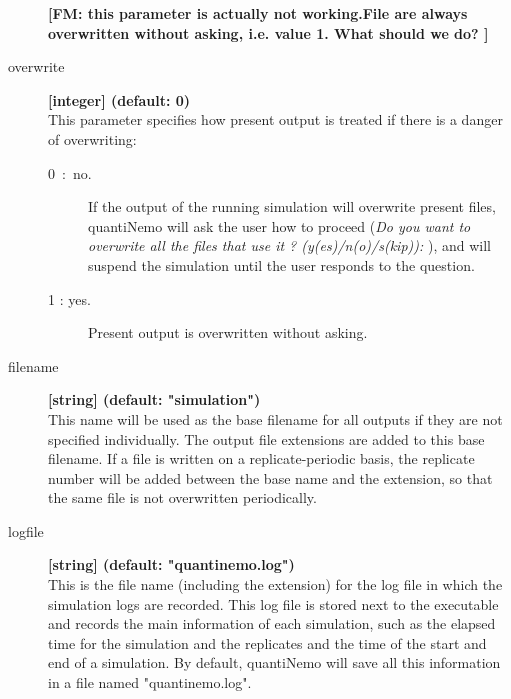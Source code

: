 \documentclass[letterpaper,12pt,oneside]{book}
\newcommand{\fm}[1]{\small {\bf \color{blue} [FM:  #1]} \normalsize}
\begin{document}
\begin{description}
\fm{this parameter is actually not working.File are always overwritten without asking, i.e. value 1. What should we do? }
\item[overwrite\index{overwrite}]\textbf{[integer] (default: 0)}\\
This parameter specifies how present output is treated if there is a danger of overwriting:
\begin{description}
\item[0~:~no.] If the output of the running simulation will overwrite present files, quantiNemo will ask the user how to proceed (\textit{Do you want to overwrite all the files that use it ? (y(es)/n(o)/s(kip)):} ), and will suspend the simulation until the user responds to the question.
\item[1 : yes.] Present output is overwritten without asking.    
\end{description}


\item[filename\index{filename}]\textbf{[string] (default: "simulation")}\\
This name will be used as the base filename for all outputs if they are not specified individually. The output file extensions are added to this base filename. If a file is written on a replicate-periodic basis, the replicate number will be added between the base name and the extension, so that the same file is not overwritten periodically.  


\item[logfile\index{logfile}] \textbf{[string] (default: "quantinemo.log")}\\
This is the file name (including the extension) for the log file in which the simulation logs are recorded. This log file is stored next to the executable and records the main information of each simulation, such as the elapsed time for the simulation and the replicates and the time of the start and end of a simulation. By default, quantiNemo will save all this information in a file named "quantinemo.log".


\end{description}
\end{document}
